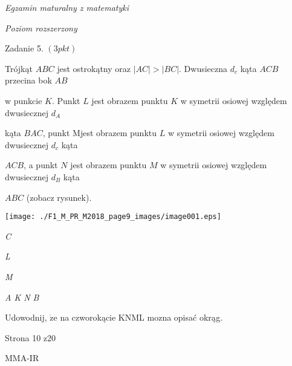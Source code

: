 \documentclass[a4paper,12pt]{article}
\begin{document}
{\it Egzamin maturalny z matematyki}

{\it Poziom rozszerzony}

Zadanie 5. $(3pkt)$

Trójkąt $ABC$ jest ostrokątny oraz $|AC|>|BC|$. Dwusieczna $d_{c}$ kąta $ACB$ przecina bok $AB$

w punkcie $K$. Punkt $L$ jest obrazem punktu $K$ w symetrii osiowej względem dwusiecznej $d_{A}$

kąta $BAC$, punkt Mjest obrazem punktu $L$ w symetrii osiowej względem dwusiecznej $d_{c}$ kąta

$ACB$, a punkt $N$ jest obrazem punktu $M$ w symetrii osiowej względem dwusiecznej $d_{B}$ kąta

$ABC$ (zobacz rysunek).
\begin{center}
\texttt{[image: ./F1\_M\_PR\_M2018\_page9\_images/image001.eps]}
\end{center}
{\it C}

{\it L}

{\it M}

{\it A  K N  B}

Udowodnij, $\dot{\mathrm{z}}\mathrm{e}$ na czworokącie KNML mozna opisać okrąg.

Strona 10 z20

MMA-IR
\end{document}
